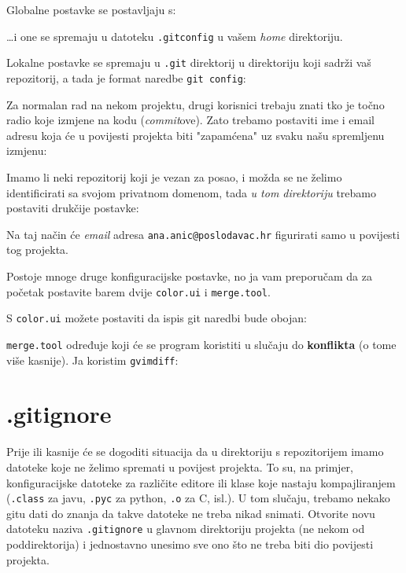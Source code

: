 Globalne postavke se postavljaju s:


\dots{}i one se spremaju u datoteku \verb+.gitconfig+ u vašem \emph{home} direktoriju.

Lokalne postavke se spremaju u \verb+.git+ direktorij u direktoriju koji sadrži vaš repozitorij, a tada je format naredbe \verb+git config+:


Za normalan rad na nekom projektu, drugi korisnici trebaju znati tko je točno radio koje izmjene na kodu (\emph{commit}ove).
Zato trebamo postaviti ime i email adresu koja će u povijesti projekta biti "zapamćena" uz svaku našu spremljenu izmjenu:



Imamo li neki repozitorij koji je vezan za posao, i možda se ne želimo identificirati sa svojom privatnom domenom, tada \emph{u tom direktoriju} trebamo postaviti drukčije postavke:



Na taj način će \emph{email} adresa \verb+ana.anic@poslodavac.hr+ figurirati samo u povijesti tog projekta.

Postoje mnoge druge konfiguracijske postavke, no ja vam preporučam da za početak postavite barem dvije \verb+color.ui+ i \verb+merge.tool+.

S \verb+color.ui+ možete postaviti da ispis git naredbi bude obojan:



\verb+merge.tool+ određuje koji će se program koristiti u slučaju do \textbf{konflikta} (o tome više kasnije). Ja koristim \verb+gvimdiff+:



\section*{.gitignore}

Prije ili kasnije će se dogoditi situacija da u direktoriju s repozitorijem imamo datoteke koje ne želimo spremati u povijest projekta.
To su, na primjer, konfiguracijske datoteke za različite editore ili klase koje nastaju kompajliranjem (\verb+.class+ za javu, \verb+.pyc+ za python, \verb+.o+ za C, isl.).
U tom slučaju, trebamo nekako gitu dati do znanja da takve datoteke ne treba nikad snimati.
Otvorite novu datoteku naziva \verb+.gitignore+ u glavnom direktoriju projekta (ne nekom od poddirektorija) i jednostavno unesimo sve ono što ne treba biti dio povijesti projekta.

